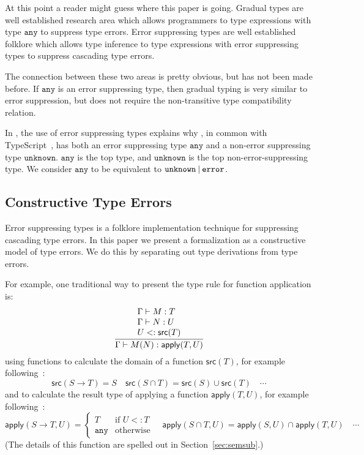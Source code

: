 \documentclass[acmsmall,review,screen]{acmart}
\makeatletter
\newcommand{\infer}[2]{\frac{\displaystyle\begin{array}{@{}l@{}}#1\end{array}}{\displaystyle#2}}
\newcommand{\ANY}{\mathtt{any}}
\newcommand{\UNKNOWN}{\mathtt{unknown}}
\newcommand{\ERROR}{\mathtt{error}}
\newcommand{\APPLY}{\mathsf{apply}}
\newcommand{\SRC}{\mathsf{src}}
\newcommand{\UNION}{\mathbin{\mathtt{\char`\|}}}
\newcommand{\fun}{\mathbin{\rightarrow}}
\makeatother
\begin{document}
At this point a reader might guess where this paper is going.  Gradual
types are well established research area which allows programmers
to type expressions with type $\ANY$ to suppress type errors.  Error
suppressing types are well established folklore which
allows type inference to type expressions with error suppressing types
to suppress cascading type errors.

The connection between these two areas is pretty obvious, but has not
been made before. If $\ANY$ is an error suppressing type, then
gradual typing is very similar to error suppression, but does
not require the non-transitive type compatibility relation.

In , the use of error suppressing types explains why
, in common with TypeScript~\cite{TypeScript}, has both an
error suppressing type $\ANY$ and a non-error suppressing type
$\UNKNOWN$. $\ANY$ is the top type, and $\UNKNOWN$ is the top
non-error-suppressing type. We consider $\ANY$ to be equivalent to
$\UNKNOWN \UNION \ERROR$.

\subsection{Constructive Type Errors}

Error suppressing types is a folklore implementation technique
for suppressing cascading type errors. In this paper we present
a formalization as a constructive model of type errors. We do this by
separating out type derivations from type errors.

For example, one traditional way to present the type rule for function
application is:
\[
  \infer{
    \Gamma \vdash M : T \\
    \Gamma \vdash N : U \\
    U <: \SRC(T)
  }{
    \Gamma \vdash M(N) : \APPLY(T,U)
  }
\]
using functions to calculate the domain of a function $\SRC(T)$, for example
following~\cite[\S5.2]{Ken21:DownDirty}:
\[
  \SRC(S \fun T) = S
\quad
  \SRC(S \cap T) = \SRC(S) \cup \SRC(T)
\quad
  \cdots
\]
and to calculate the result type of applying a function $\APPLY(T,U)$,
for example following~\cite[\S5.3]{Ken21:DownDirty}:
\[ 
  \APPLY(S \fun T, U) =
  \left\{\begin{array}{ll}
    T & \text{if } U <: T \\
    \ANY & \text{otherwise}
  \end{array}\right.
\quad
  \APPLY(S \cap T, U) = \APPLY(S, U) \cap \APPLY(T, U)
\quad
  \cdots
\]
(The details of this function are spelled out in Section~\ref{sec:semsub}.)
\end{document}
